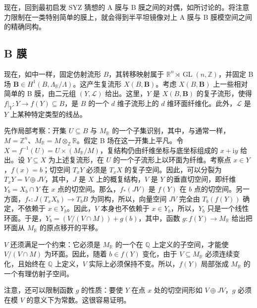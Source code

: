 现在，回到最初启发 SYZ 猜想的 A 膜与 B 膜之间的对偶，如所讨论的。将注意力限制在一类特别简单的膜上，就会得到半平坦镜像对上 A 膜与 B 膜模空间之间的精确同构。

\subsection{B 膜}\label{sec:6.3.1}

现在，如中一样，固定仿射流形 $B$，其转移映射属于 $\mathbb R^n\rtimes\operatorname{GL}(n,\mathbb Z)$，并固定 B 场 $\mathbf B\in H^1(B,\Lambda_{\mathbb R}/\Lambda)$。这产生复流形 $X(B,\mathbf B)$。考虑 $X(B,\mathbf B)$ 上一些相对简单的 B 膜，由二元组 $(Y,\mathcal L)$ 给出。这里，$Y$ 是 $X(B,\mathbf B)$ 的复子流形，使得 $f|_Y\colon Y\to f(Y)\subseteq B$，是 $B$ 的一个 $d$ 维子流形上的 $d$ 维环面纤维化。此外，$\mathcal L$ 是 $Y$ 上某种特定类型的线丛。

先作局部考察：开集 $U\subseteq B$ 与 $M_{\mathbb R}$ 的一个子集识别，其中，与通常一样，$M=\mathbb Z^n$、$M_{\mathbb R}=M\otimes_{\mathbb Z}\mathbb R$。假定 B 场在这一开集上平凡。令 $X=f^{-1}(U)=U\times(M_{\mathbb R}/M)$，复结构仍由纤维坐标与底坐标组成的 $x+\mathrm i y$ 给出。设 $Y\subseteq X$ 为上述复流形，在 $U$ 的一个子流形上以环面为纤维。考察点 $x\in Y$，$f(x)=b$；切空间 $T_xY$ 必须是 $T_xX$ 的复子空间。因此，可以分裂为 $T_xY=V\oplus JV$，其中，$J$ 是 $X$ 上的概复结构，$V$ 是 $Y$ 的垂直切空间，即纤维 $Y_b=X_b\cap Y$ 在 $x$ 点的切空间。那么，$f_*(JV)$ 是 $f(Y)$ 在 $b$ 点的切空间。另一方面，$f_*\colon J(T_xX_b)\to T_bB$ 为同构，所以，向量空间 $JV$ 完全由 $T_b(f(Y))$ 确定，不依赖于 $x\in Y_b$。因此，$V$ 本身也不依赖于 $x\in Y_b$，所以，$Y_b$ 只是一个线性环面。于是，$Y_b=(V/(V\cap M))+g(b)$，其中，函数 $g\colon f(Y)\to M_{\mathbb R}$ 给出把环面从 $M_{\mathbb R}$ 的原点移开的平移。

$V$ 还须满足一个约束：它必须是 $M_{\mathbb R}$ 的一个在 $\mathbb Q$ 上定义的子空间，才能使 $V/(V\cap M)$ 为环面。因此，随着 $b\in f(Y)$ 变化，由于 $V\subseteq M_{\mathbb R}$ 必须连续变化，且始终在 $\mathbb Q$ 上定义，$V$ 实际上必须保持不变。所以，$f(Y)$ 局部张成 $M_{\mathbb R}$ 的一个有理仿射子空间。

注意，还可以限制函数 $g$ 的性质：要使 $Y$ 在点 $x$ 处的切空间形如 $V\oplus JV$，$g$ 必须在模 $V$ 的意义下为常数。这很容易证明。

